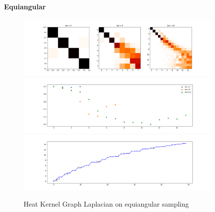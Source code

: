 \paragraph{Equiangular}
\begin{figure}[h]
	\label{fig:HeatKernelGraphLaplacianEquiangular}
	\caption{Heat Kernel Graph Laplacian on equiangular sampling}
	\centering
	\includegraphics[width=0.9\textwidth]{../codes/02.HeatKernelGraphLaplacian/equiangular/equi_full.png}
	\includegraphics[width=0.9\textwidth]{../codes/02.HeatKernelGraphLaplacian/equiangular/equi_full_diagonal.png}	
	\includegraphics[width=0.9\textwidth]{../codes/02.HeatKernelGraphLaplacian/equiangular/equi_full_eigenvalues_16.png}	
\end{figure}


